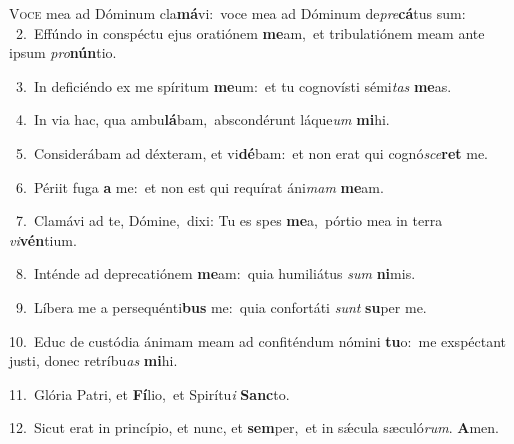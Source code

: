 \lettrine{\initial\textcolor{\initialcolor}{V}}{oce} mea ad Dóminum cla\-\textbf{má}\-vi:~\star voce mea ad Dóminum de\-\textit{pre}\-\textbf{cá}tus sum:\\
{\numbfont\textcolor{\numbcolor}{~2.}}~Effúndo in conspéctu ejus oratiónem \textbf{me}\-am,~\star et tribulatiónem meam ante ipsum \textit{pro}\-\textbf{nún}tio.\par
{\numbfont\textcolor{\numbcolor}{~3.}}~In deficiéndo ex me spíritum \textbf{me}\-um:~\star et tu cognovísti sémi\textit{tas} \textbf{me}\-as.\par
{\numbfont\textcolor{\numbcolor}{~4.}}~In via hac, qua ambu\-\textbf{lá}\-bam,~\star abscondérunt láque\textit{um} \textbf{mi}\-hi.\par
{\numbfont\textcolor{\numbcolor}{~5.}}~Considerábam ad déxteram, et vi\-\textbf{dé}\-bam:~\star et non erat qui cognó\-\textit{sce}\-\textbf{ret} me.\par
{\numbfont\textcolor{\numbcolor}{~6.}}~Périit fuga \textbf{a} me:~\star et non est qui requírat áni\textit{mam} \textbf{me}\-am.\par
{\numbfont\textcolor{\numbcolor}{~7.}}~Clamávi ad te, Dómine,~\dagger dixi: Tu es spes \textbf{me}\-a,~\star pórtio mea in terra \textit{vi}\-\textbf{vén}tium.\par
{\numbfont\textcolor{\numbcolor}{~8.}}~Inténde ad deprecatiónem \textbf{me}\-am:~\star quia humiliátus \textit{sum} \textbf{ni}\-mis.\par
{\numbfont\textcolor{\numbcolor}{~9.}}~Líbera me a persequénti\textbf{bus} me:~\star quia confortáti \textit{sunt} \textbf{su}\-per me.\par
{\numbfont\textcolor{\numbcolor}{10.}}~Educ de custódia ánimam meam ad confiténdum nómini \textbf{tu}\-o:~\star me exspéctant justi, donec retríbu\textit{as} \textbf{mi}\-hi.\par
{\numbfont\textcolor{\numbcolor}{11.}}~Glória Patri, et \textbf{Fí}\-lio,~\star et Spirítu\textit{i} \textbf{Sanc}\-to.\par
{\numbfont\textcolor{\numbcolor}{12.}}~Sicut erat in princípio, et nunc, et \textbf{sem}\-per,~\star et in sǽcula sæculó\-\textit{rum}\-. \textbf{A}\-men.\par
